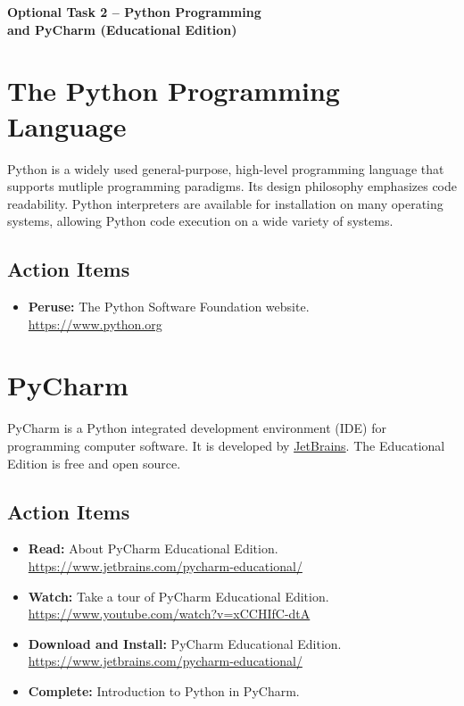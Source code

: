 \documentclass[11pt]{article}
\begin{document}
\begin{center}
{\bfseries \LARGE Optional Task 2 -- Python Programming \\ and PyCharm (Educational Edition) \\[8mm]}
\end{center}


\section{The Python Programming Language}

Python is a widely used general-purpose, high-level programming language that supports mutliple programming paradigms.
Its design philosophy emphasizes code readability.
Python interpreters are available for installation on many operating systems, allowing Python code execution on a wide variety of systems.

\subsection*{Action Items}

\begin{itemize}
\item \textbf{Peruse:} The Python Software Foundation website. \\
\url{https://www.python.org}
\end{itemize}


\section{PyCharm}

PyCharm is a Python integrated development environment (IDE) for programming computer software.
It is developed by \href{https://www.jetbrains.com}{JetBrains}.
The Educational Edition is free and open source.

\subsection*{Action Items}

\begin{itemize}
\item \textbf{Read:} About PyCharm Educational Edition. \\
\url{https://www.jetbrains.com/pycharm-educational/}
\item \textbf{Watch:} Take a tour of PyCharm Educational Edition. \\
\url{https://www.youtube.com/watch?v=xCCHIfC-dtA}
\item \textbf{Download and Install:} PyCharm Educational Edition. \\
\url{https://www.jetbrains.com/pycharm-educational/}
\item \textbf{Complete:} Introduction to Python in PyCharm.
\end{itemize}
\end{document}
